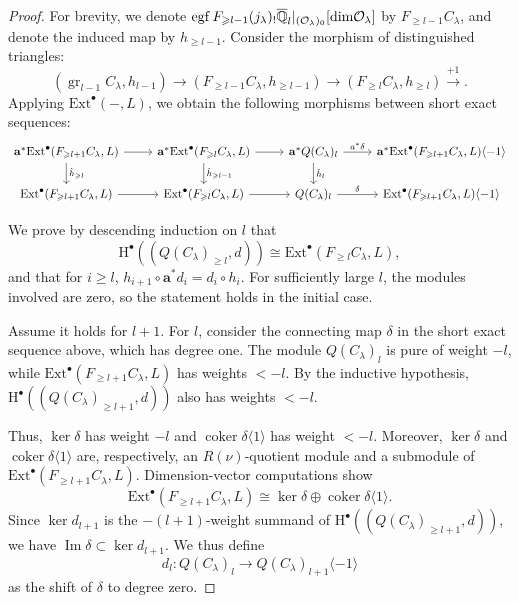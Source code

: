 \documentclass[10pt,a4paper]{amsart}
\def\dim{\mbox{\rm dim}}   \def\End{\mbox{\rm End}}
\begin{document}
\begin{proof}
For brevity, we denote $\operatorname{egf} F_{\geq l-1} (j_{\lambda})_! \overline{\mathbb{Q}}_l |_{(\mathcal{O}_{\lambda})_0} [\dim \mathcal{O}_{\lambda}]$ by $F_{\geq l-1} C_{\lambda}$, and denote the induced map by $h_{\geq l-1}$.
Consider the morphism of distinguished triangles:
\[
(\operatorname{gr}_{l-1}C_{\lambda},h_{l-1}) \to 
(F_{\geq l-1} C_{\lambda}, h_{\geq l-1}) \to 
(F_{\geq l} C_{\lambda}, h_{\geq l}) \xrightarrow{+1}.
\]
Applying $\mathrm{Ext}^{\bullet}(-, L)$, we obtain the following morphisms between short exact sequences:
\[
\begin{tikzcd}
\mathbf{a}^* \mathrm{Ext}^{\bullet}(F_{\geq l+1} C_{\lambda}, L) \arrow[d, "\hat{h}_{\geq l}"] \arrow[r] &
\mathbf{a}^* \mathrm{Ext}^{\bullet}(F_{\geq l} C_{\lambda}, L) \arrow[d, "\hat{h}_{\geq l-1}"] \arrow[r] &
\mathbf{a}^* Q(C_{\lambda})_l \arrow[d, "\hat{h}_l"] \arrow[r, "a^* \delta"] &
\mathbf{a}^* \mathrm{Ext}^{\bullet}(F_{\geq l+1} C_{\lambda}, L) \langle -1 \rangle \\
\mathrm{Ext}^{\bullet}(F_{\geq l+1} C_{\lambda}, L) \arrow[r] &
\mathrm{Ext}^{\bullet}(F_{\geq l} C_{\lambda}, L) \arrow[r] &
Q(C_{\lambda})_l \arrow[r, "\delta"] &
\mathrm{Ext}^{\bullet}(F_{\geq l+1} C_{\lambda}, L) \langle -1 \rangle
\end{tikzcd}
\]

We prove by descending induction on $l$ that
\[
\mathrm{H}^{\bullet}((Q(C_{\lambda})_{\geq l}, d)) \cong \mathrm{Ext}^{\bullet}(F_{\geq l} C_{\lambda}, L),
\]
and that for $i \geq l$, $h_{i+1} \circ \mathbf{a}^* d_i = d_i \circ h_i$. For sufficiently large $l$, the modules involved are zero, so the statement holds in the initial case.

Assume it holds for $l+1$. For $l$, consider the connecting map $\delta$ in the short exact sequence above, which has degree one. The module $Q(C_{\lambda})_l$ is pure of weight $-l$, while $\mathrm{Ext}^{\bullet}(F_{\geq l+1} C_{\lambda}, L)$ has weights $< -l$. By the inductive hypothesis, $\mathrm{H}^{\bullet}((Q(C_{\lambda})_{\geq l+1}, d))$ also has weights $< -l$.

Thus, $\ker \delta$ has weight $-l$ and $\operatorname{coker} \delta \langle 1 \rangle$ has weight $< -l$. Moreover, $\ker \delta$ and $\operatorname{coker} \delta \langle 1 \rangle$ are, respectively, an $R(\nu)$-quotient module and a submodule of $\mathrm{Ext}^{\bullet}(F_{\geq l+1} C_{\lambda}, L)$. Dimension-vector computations show
\[
\mathrm{Ext}^{\bullet}(F_{\geq l+1} C_{\lambda}, L) \cong \ker \delta \oplus \operatorname{coker} \delta \langle 1 \rangle.
\]
Since $\ker d_{l+1}$ is the $-(l+1)$-weight summand of $\mathrm{H}^{\bullet}((Q(C_{\lambda})_{\geq l+1}, d))$, we have $\operatorname{Im} \delta \subset \ker d_{l+1}$. We thus define
\[
d_l : Q(C_{\lambda})_l \to Q(C_{\lambda})_{l+1} \langle -1 \rangle
\]
as the shift of $\delta$ to degree zero.


\end{proof}
\end{document}
